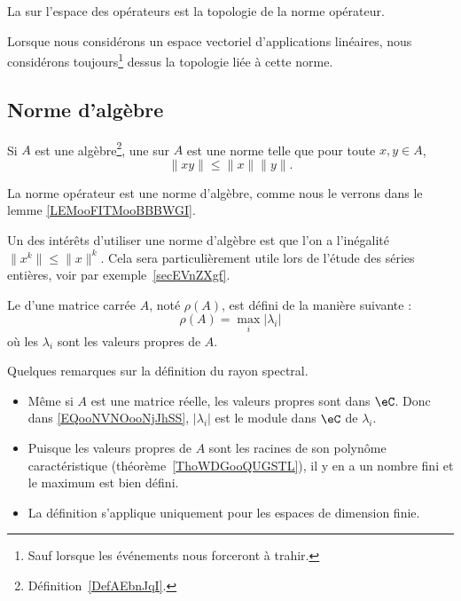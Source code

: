 \begin{definition}
	La  sur l'espace des opérateurs est la topologie de la norme opérateur.
\end{definition}
Lorsque nous considérons un espace vectoriel d'applications linéaires, nous considérons toujours\footnote{Sauf lorsque les événements nous forceront à trahir.} dessus la topologie liée à cette norme.

\subsection{Norme d'algèbre}

\begin{definition}  \label{DefJWRWQue}
	Si \( A\) est une algèbre\footnote{Définition~\ref{DefAEbnJqI}.}, une  sur \( A\) est une norme telle que pour toute \( x,y\in A\),
	\begin{equation}
		\| xy \|\leq \| x \|\| y \|.
	\end{equation}
\end{definition}
La norme opérateur est une norme d'algèbre, comme nous le verrons dans le lemme \ref{LEMooFITMooBBBWGI}.

Un des intérêts d'utiliser une norme d'algèbre est que l'on a l'inégalité \( \| x^k \|\leq \| x \|^k \). Cela sera particulièrement utile lors de l'étude des séries entières, voir par exemple~\ref{secEVnZXgf}.

\begin{definition}      \label{DEFooEAUKooSsjqaL}
	Le  d'une matrice carrée \( A\), noté \( \rho(A)\), est défini de la manière suivante :
	\begin{equation}    \label{EQooNVNOooNjJhSS}
		\rho(A)=\max_i|\lambda_i|
	\end{equation}
	où les \( \lambda_i\) sont les valeurs propres de \( A\).
\end{definition}

\begin{normaltext}
	Quelques remarques sur la définition du rayon spectral.
	\begin{itemize}
		\item
		      Même si \( A\) est une matrice réelle, les valeurs propres sont dans \( \eC\). Donc dans \eqref{EQooNVNOooNjJhSS}, \( | \lambda_i |\) est le module dans \( \eC\) de \( \lambda_i\).
		\item
		      Puisque les valeurs propres de \( A\) sont les racines de son polynôme caractéristique (théorème~\ref{ThoWDGooQUGSTL}), il y en a un nombre fini et le maximum est bien défini.
		\item
		      La définition s'applique uniquement pour les espaces de dimension finie.
	\end{itemize}
\end{normaltext}

